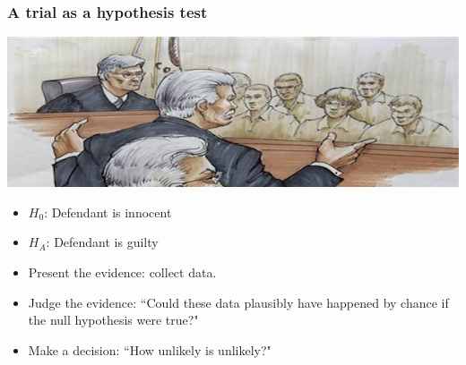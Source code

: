 \documentclass[11pt,containsverbatim,handout,xcolor=xelatex,dvipsnames,table]{beamer}
\begin{document}

\begin{frame}
\frametitle{A trial as a hypothesis test}

\begin{center}
\includegraphics[width=\textwidth]{figures/trial}
\end{center}

\begin{itemize}

\item $H_0$: Defendant is innocent 

\item $H_A$: Defendant is guilty

\item Present the evidence: collect data.

\item Judge the evidence: ``Could these data plausibly have happened by chance if the null hypothesis were true?"

\item Make a decision: ``How unlikely is unlikely?"

\end{itemize}

\end{frame}

\end{document}
